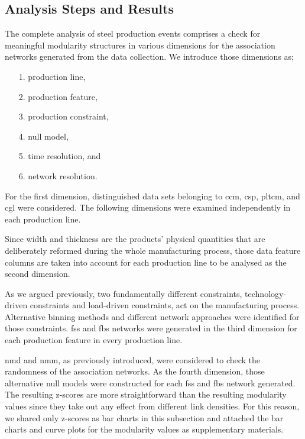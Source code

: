 \subsection{Analysis Steps and Results}

The complete analysis of steel production events comprises a check for meaningful modularity structures in various dimensions for the association networks generated from the data collection. We introduce those dimensions as;
\begin{itemize}
	\item[1.] production line,
	\item[2.] production feature,
	\item[3.] production constraint,
	\item[4.] null model,
	\item[5.] time resolution, and
	\item[6.] network resolution.
\end{itemize} 
For the first dimension, distinguished data sets belonging to \acs{ccm}, \acs{csp}, \acs{pltcm}, and \acs{cgl} were considered. The following dimensions were examined independently in each production line.

Since width and thickness are the products' physical quantities that are deliberately reformed during the whole manufacturing process, those data feature columns are taken into account for each production line to be analysed as the second dimension. 

As we argued previously, two fundamentally different constraints, technology-driven constraints and load-driven constraints, act on the manufacturing process. Alternative binning methods and different network approaches were identified for those constraints. \acs{fss} and \acs{fbs} networks were generated in the third dimension for each production feature in every production line.

\acs{nmd} and \acs{nmm}, as previously introduced, were considered to check the randomness of the association networks. As the fourth dimension, those alternative null models were constructed for each \acs{fss} and \acs{fbs} network generated. The resulting z-scores are more straightforward than the resulting modularity values since they take out any effect from different link densities. For this reason, we shared only z-scores as bar charts in this subsection and attached the bar charts and curve plots for the modularity values as supplementary materials.

